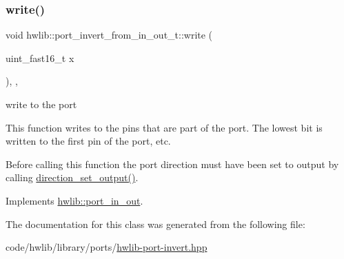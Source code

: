 \subsubsection{\texorpdfstring{write()}{write()}}
{\footnotesize\ttfamily void hwlib\+::port\+\_\+invert\+\_\+from\+\_\+in\+\_\+out\+\_\+t\+::write (\begin{DoxyParamCaption}\item[{uint\+\_\+fast16\+\_\+t}]{x }\end{DoxyParamCaption})\hspace{0.3cm}{\ttfamily [inline]}, {\ttfamily [override]}, {\ttfamily [virtual]}}

write to the port

This function writes to the pins that are part of the port. The lowest bit is written to the first pin of the port, etc.

Before calling this function the port direction must have been set to output by calling \hyperlink{classhwlib_1_1port__invert__from__in__out__t_a081fcd37931c8b02a8bcc61899ea5346}{direction\+\_\+set\+\_\+output()}. 

Implements \hyperlink{classhwlib_1_1port__in__out_a0019c1f35d6f7b1d3ace6b22da86ecec}{hwlib\+::port\+\_\+in\+\_\+out}.



The documentation for this class was generated from the following file\+:\begin{DoxyCompactItemize}
\item 
code/hwlib/library/ports/\hyperlink{hwlib-port-invert_8hpp}{hwlib-\/port-\/invert.\+hpp}\end{DoxyCompactItemize}
